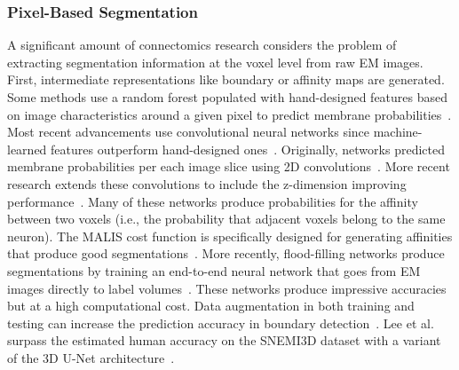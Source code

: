 \subsubsection{Pixel-Based Segmentation}
A significant amount of connectomics research considers the problem of extracting segmentation information at the voxel level from raw EM images. First, intermediate representations like boundary or affinity maps are generated. Some methods use a random forest populated with hand-designed features based on image characteristics around a given pixel to predict membrane probabilities~\cite{kaynig2015large}.
Most recent advancements use convolutional neural networks since machine-learned features outperform hand-designed ones~\cite{bogovic2013learned}.
Originally, networks predicted membrane probabilities per each image slice using 2D convolutions~\cite{seymour2016rhoananet,ronneberger2015u,kaynig2015large,ciresan2012deep,jain2010boundary,amelio_segmentation}.
More recent research extends these convolutions to include the z-dimension improving performance~\cite{lee2015recursive,parag2017anisotropic,cciccek20163d,turaga2010convolutional}.
Many of these networks produce probabilities for the affinity between two voxels (i.e., the probability that adjacent voxels belong to the same neuron). 
The MALIS cost function is specifically designed for generating affinities that produce good segmentations~\cite{briggman2009maximin}. 
More recently, flood-filling networks produce segmentations by training an end-to-end neural network that goes from EM images directly to label volumes~\cite{januszewski2016flood}. 
These networks produce impressive accuracies but at a high computational cost.
Data augmentation in both training and testing can increase the prediction accuracy in boundary detection~\cite{zeng2017deepem3d}.
Lee et al. surpass the estimated human accuracy on the SNEMI3D dataset with a variant of the 3D U-Net architecture~\cite{lee2017superhuman}.



